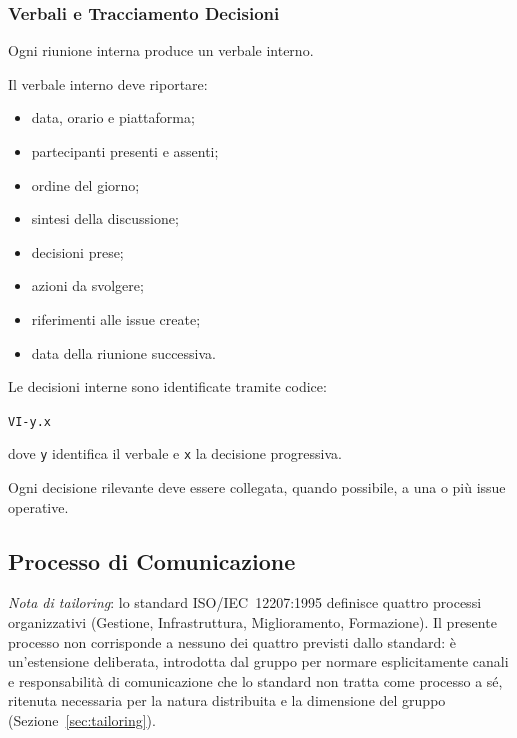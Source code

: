 
\subsubsection{Verbali e Tracciamento Decisioni}

Ogni riunione interna produce un verbale interno.

Il verbale interno deve riportare:

\begin{itemize}
    \item data, orario e piattaforma;
    \item partecipanti presenti e assenti;
    \item ordine del giorno;
    \item sintesi della discussione;
    \item decisioni prese;
    \item azioni da svolgere;
    \item riferimenti alle issue create;
    \item data della riunione successiva.
\end{itemize}

Le decisioni interne sono identificate tramite codice:

\begin{center}
    \texttt{VI-y.x}
\end{center}

dove \texttt{y} identifica il verbale e \texttt{x} la decisione progressiva.

Ogni decisione rilevante deve essere collegata, quando possibile, a una o più
issue operative.


\subsection{Processo di Comunicazione}
\label{sec:comunicazione}

\textit{Nota di tailoring}: lo standard ISO/IEC~12207:1995 definisce quattro
processi organizzativi (Gestione, Infrastruttura, Miglioramento, Formazione).
Il presente processo non corrisponde a nessuno dei quattro previsti dallo
standard: è un'estensione deliberata, introdotta dal gruppo per normare
esplicitamente canali e responsabilità di comunicazione che lo standard non
tratta come processo a sé, ritenuta necessaria per la natura distribuita e
la dimensione del gruppo (Sezione~\ref{sec:tailoring}).

